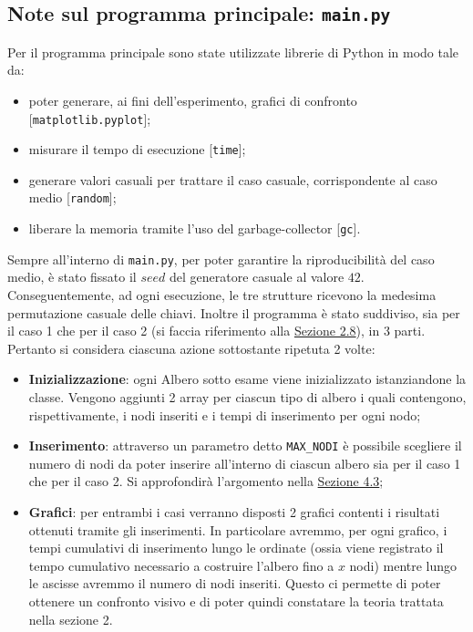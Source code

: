 \subsection{Note sul programma principale: \texttt{main.py}}
Per il programma principale sono state utilizzate librerie di Python in modo tale da:
\begin{itemize}
	\item poter generare, ai fini dell'esperimento, grafici di confronto [\texttt{matplotlib.pyplot}];
	\item misurare il tempo di esecuzione [\texttt{time}];
	\item generare valori casuali per trattare il caso casuale, corrispondente al caso medio [\texttt{random}];
	\item liberare la memoria tramite l'uso del garbage-collector [\texttt{gc}].
\end{itemize}
Sempre all'interno di \texttt{main.py}, per poter garantire la riproducibilità del caso medio, è stato fissato il $seed$ del generatore casuale al valore $42$. Conseguentemente, ad ogni esecuzione, le tre strutture ricevono la medesima permutazione casuale delle chiavi.
Inoltre il programma è stato suddiviso, sia per il caso 1 che per il caso 2 (si faccia riferimento alla \hyperref[Sezione2.8]{Sezione 2.8}), in 3 parti. Pertanto si considera ciascuna azione sottostante ripetuta 2 volte:
\begin{itemize}
	\item \textbf{Inizializzazione}: ogni Albero sotto esame viene inizializzato istanziandone la classe. Vengono aggiunti 2 array per ciascun tipo di albero i quali contengono, rispettivamente, i nodi inseriti e i tempi di inserimento per ogni nodo;
	\item \textbf{Inserimento}: attraverso un parametro detto \texttt{MAX\_NODI} è possibile scegliere il numero di nodi da poter inserire all'interno di ciascun albero sia per il caso 1 che per il caso 2. Si approfondirà l'argomento nella \hyperref[Sezione4.3]{Sezione 4.3};
	\item \textbf{Grafici}: per entrambi i casi verranno disposti 2 grafici contenti i risultati ottenuti tramite gli inserimenti. In particolare avremmo, per ogni grafico, i tempi cumulativi di inserimento lungo le ordinate (ossia viene registrato il tempo cumulativo necessario a costruire l'albero fino a $x$ nodi) mentre lungo le ascisse avremmo il numero di nodi inseriti. Questo ci permette di poter ottenere un confronto visivo e di poter quindi constatare la teoria trattata nella sezione 2.
\end{itemize}
